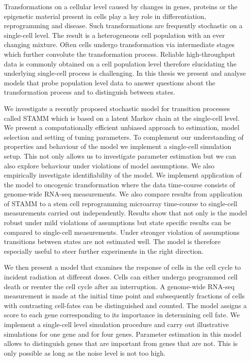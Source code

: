 \vspace{-1.5cm}
Transformations on a cellular level caused by changes in genes, proteins or the epigenetic material present in cells play a key role in differentiation, reprogramming and disease. Such transformations are frequently stochastic on a single-cell level. The result is a heterogeneous cell population with an ever changing mixture. Often cells undergo transformation via intermediate stages which further  convolute the transformation process. Reliable high-throughput data is commonly obtained on a cell population level therefore elucidating the underlying single-cell process is challenging. In this thesis we present and analyse models that probe population level data to answer questions about the transformation process and to distinguish between states.

We investigate a recently proposed stochastic model for transition processes called STAMM which is based on a latent Markov chain at the single-cell level. We present a computationally efficient unbiased approach to estimation, model selection and setting of tuning parameters. To complement our understanding of properties and behaviour of the model we implement a single-cell simulation setup. This not only allows us to investigate parameter estimation but we can also explore behaviour under violations of model assumptions. We also empirically investigate identifiability of the model. We implement application of the model to oncogenic transformation where the data time-course consists of genome-wide RNA-seq measurements. We also compare results from application of STAMM to a stem cell reprogramming microarray time-course to single-cell measurements carried out independently. Results show that not only is the model robust under mild violations of assumptions but state specific results can be compared to single-cell measurements. Under stronger violation of assumptions transitions between states are not estimated well. The model is therefore especially useful to steer further experiments in the right direction.

We then present  a model that examines the response of cells in the cell cycle to incident radiation at different doses. Cells can either undergo programmed cell death or reenter the cell cycle after an interruption. A genome-wide RNA-seq measurement is made at the initial time point and subsequently fractions of cells with contrasting cell-fates can be distinguished and counted. The model assigns a score to each gene corresponding to its importance in determining cell fate. We implement a single-cell level simulation procedure and carry out illustrative simulations for one gene and for four genes. Parameter estimation in this model allows to distinguish genes that are important from genes that are not. This is only possible as long as the noise level is not too high.


